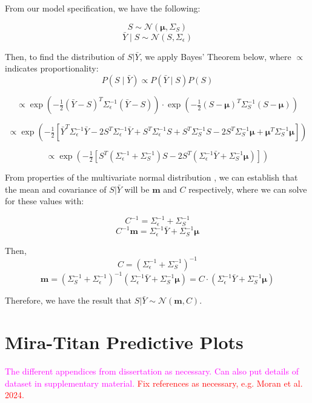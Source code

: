 \documentclass[11pt]{article}
\begin{document}
From our model specification, we have the following:

\[
S \sim \mathcal{N}(\boldsymbol{\mu}, \Sigma_S)
\]
\[
\bar{Y} \mid S \sim \mathcal{N}(S, \Sigma_\epsilon)
\]

Then, to find the distribution of $S|\bar{Y}$, we apply Bayes' Theorem below, 
where $\propto$ indicates proportionality:
\[
P(S \mid \bar{Y}) \propto P(\bar{Y} \mid S) P(S)
\]

\[
\propto \exp\left(-\tfrac{1}{2} (\bar{Y} - S)^T \Sigma_\epsilon^{-1} (\bar{Y} - S) \right) 
\cdot \exp\left(-\tfrac{1}{2} (S - \boldsymbol{\mu})^T \Sigma_S^{-1} (S - \boldsymbol{\mu})\right)
\]

\[
\propto \exp\left(-\tfrac{1}{2} \left[ \bar{Y}^T \Sigma_\epsilon^{-1} \bar{Y} 
- 2 S^T \Sigma_\epsilon^{-1} \bar{Y} + S^T \Sigma_\epsilon^{-1} S + S^T \Sigma_S^{-1} S 
- 2 S^T \Sigma_S^{-1} \boldsymbol{\mu} + \boldsymbol{\mu}^T \Sigma_S^{-1} \boldsymbol{\mu} \right] \right)
\]

\[
\propto \exp\left( -\tfrac{1}{2} \left[ S^T (\Sigma_\epsilon^{-1} + \Sigma_S^{-1}) S 
- 2 S^T (\Sigma_\epsilon^{-1} \bar{Y} + \Sigma_S^{-1} \boldsymbol{\mu}) \right] \right)
\]

From properties of the multivariate normal distribution \citep[e.g., Equation 7.1 of][]{hoff2009first},
we can establish that the mean and covariance of $S|\bar{Y}$ will be $\boldsymbol{m}$
and $C$ respectively, where we can solve for these values with:

\[
C^{-1} = \Sigma_\epsilon^{-1} + \Sigma_S^{-1}
\]
\[
C^{-1} \boldsymbol{m} = \Sigma_\epsilon^{-1} \bar{Y} + \Sigma_S^{-1} \boldsymbol{\mu}
\]

Then,
\[
C = (\Sigma_\epsilon^{-1} + \Sigma_S^{-1})^{-1}
\]
\[
\boldsymbol{m} = \left( \Sigma_S^{-1} + \Sigma_\epsilon^{-1} \right)^{-1} 
\left( \Sigma_\epsilon^{-1} \bar{Y} + \Sigma_S^{-1} \boldsymbol{\mu} \right)
= C \cdot \left( \Sigma_\epsilon^{-1} \bar{Y} + \Sigma_S^{-1} \boldsymbol{\mu} \right)
\]

Therefore, we have the result that $S|\bar{Y} \sim \mathcal{N}(\boldsymbol{m}, C)$.


\section{Mira-Titan Predictive Plots}
\label{sec:apdx_mira_plots}

\textcolor{magenta}{The different appendices from dissertation as necessary. 
Can also put details of dataset in supplementary material.} 
\textcolor{red}{Fix references as necessary, e.g. Moran et al. 2024.}
\end{document}
